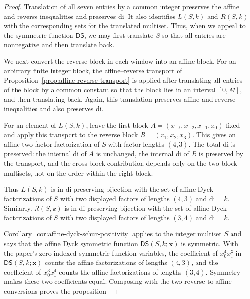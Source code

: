 \documentclass[11pt]{article}
\theoremstyle{plain}
\theoremstyle{definition}
\theoremstyle{remark}
\newcommand{\di}{\mathrm{di}}
\newcommand{\DS}{\mathsf{DS}}
\begin{document}
\begin{proof}
Translation of all seven entries by a common integer preserves the affine and
reverse inequalities and preserves \(\di\).  It also identifies \(L(S,k)\) and
\(R(S,k)\) with the corresponding sets for the translated multiset.  Thus, when
we appeal to the symmetric function \(\DS\), we may first translate \(S\) so
that all entries are nonnegative and then translate back.

We next convert the reverse block in each window into an affine block.  For an
arbitrary finite integer block, the affine--reverse transport of
Proposition~\ref{prop:affine-reverse-transport} is applied after translating
all entries of the block by a common constant so that the block lies in an
interval \([0,M]\), and then translating back.  Again, this translation preserves
affine and reverse inequalities and also preserves \(\di\).

For an element of \(L(S,k)\), leave the first block
\(A=(x_{-3},x_{-2},x_{-1},x_0)\) fixed and apply this transport to the reverse
block \(B=(x_1,x_2,x_3)\).  This gives an affine two-factor factorization of
\(S\) with factor lengths \((4,3)\).  The total \(\di\) is preserved: the
internal \(\di\) of \(A\) is unchanged, the internal \(\di\) of \(B\) is
preserved by the transport, and the cross-block contribution depends only on
the two block multisets, not on the order within the right block.

Thus \(L(S,k)\) is in \(\di\)-preserving bijection with the set of affine Dyck
factorizations of \(S\) with two displayed factors of lengths \((4,3)\) and
\(\di=k\).  Similarly, \(R(S,k)\) is in \(\di\)-preserving bijection with the
set of affine Dyck factorizations of \(S\) with two displayed factors of
lengths \((3,4)\) and \(\di=k\).

Corollary~\ref{cor:affine-dyck-schur-positivity} applies to the integer
multiset \(S\) and says that the affine Dyck symmetric function
\(\DS(S,k;\mathbf{x})\) is symmetric.  With the paper's zero-indexed
symmetric-function variables, the coefficient of \(x_0^4x_1^3\) in
\(\DS(S,k;\mathbf{x})\) counts the affine factorizations of lengths \((4,3)\), and the
coefficient of \(x_0^3x_1^4\) counts the affine factorizations of lengths
\((3,4)\).  Symmetry makes these two coefficients equal.  Composing with the
two reverse-to-affine conversions proves the proposition.
\end{proof}
\end{document}
